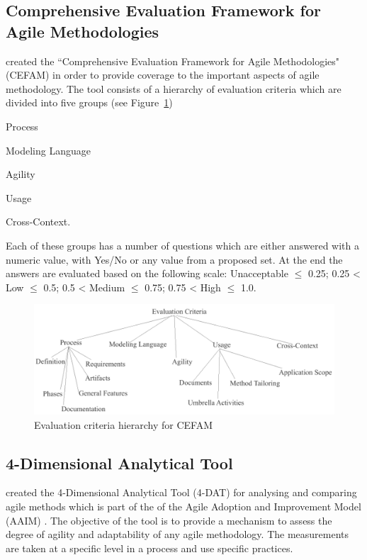 \subsection{Comprehensive Evaluation Framework for Agile Methodologies}
\citet{cefam} created the ``Comprehensive Evaluation Framework for Agile Methodologies" (CEFAM) in order to provide coverage to the important aspects of agile methodology. The tool consists of a hierarchy of evaluation criteria which are divided into five groups (see Figure~\ref{cefam})
\begin{inparaenum} [a\upshape)]
\item Process
\item Modeling Language
\item Agility
\item Usage
\item Cross-Context.
\end{inparaenum}
Each of these groups has a number of questions which are either answered with a numeric value, with Yes/No or any value from a proposed set. At the end the answers are evaluated based on the following scale: Unacceptable $\leq$ 0.25; 0.25 < Low $\leq$ 0.5; 0.5 < Medium $\leq$ 0.75; 0.75 < High $\leq$ 1.0.

\begin{figure} [H]
\centerline{\includegraphics[scale=0.75]{include/relatedwork/fig/cefam.pdf}}
\caption{Evaluation criteria hierarchy for CEFAM} 
\label{cefam}
\end{figure}

\subsection{4-Dimensional Analytical Tool} %
\citet{qumer2006measuring} created the 4-Dimensional Analytical Tool (4-DAT) for analysing and comparing agile methods which is part of the of the Agile Adoption and Improvement Model (AAIM) \cite{qumerAAIM}. The objective of the tool is to provide a mechanism to assess the degree of agility and adaptability of any agile methodology. The measurements are taken at a specific level in a process and use specific practices.

